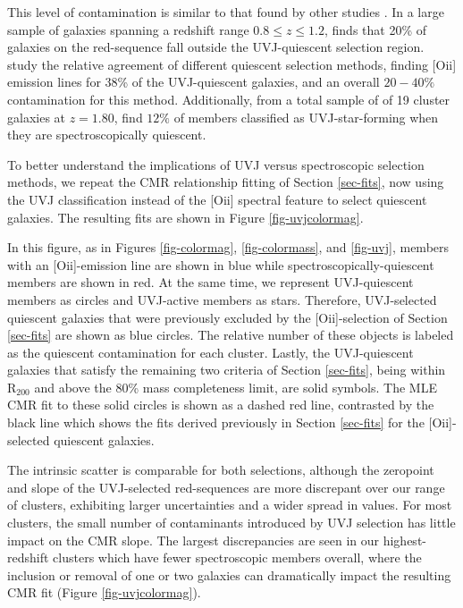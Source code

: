 This level of contamination is similar to that found by other studies \citep{kriek2014}. In a large sample of galaxies spanning a redshift range $0.8 \leq z \leq 1.2$, \citet{Cardamone:2010aa} finds that 20\% of galaxies on the red-sequence fall outside the UVJ-quiescent selection region. \citet{Moresco:2013aa} study the relative agreement of different quiescent selection methods, finding [O{\sc ii}] emission lines for 38\% of the UVJ-quiescent galaxies, and an overall $20-40\%$ contamination for this method. Additionally, from a total sample of of 19 cluster galaxies at $z = 1.80$, \citet{Newman:2014aa} find $12\%$ of members classified as UVJ-star-forming when they are spectroscopically quiescent.

To better understand the implications of UVJ versus spectroscopic selection methods, we repeat the CMR relationship fitting of Section \ref{sec-fits}, now using the UVJ classification instead of the [O{\sc ii}] spectral feature to select quiescent galaxies. The resulting fits are shown in Figure \ref{fig-uvjcolormag}.

In this figure, as in Figures \ref{fig-colormag}, \ref{fig-colormass}, and \ref{fig-uvj}, members with an [O{\sc ii}]-emission line are shown in blue while spectroscopically-quiescent members are shown in red. At the same time, we represent UVJ-quiescent members as circles and UVJ-active members as stars. Therefore, UVJ-selected quiescent galaxies that were previously excluded by the [O{\sc ii}]-selection of Section \ref{sec-fits} are shown as blue circles. The relative number of these objects is labeled as the quiescent contamination for each cluster. Lastly, the UVJ-quiescent galaxies that satisfy the remaining two criteria of Section \ref{sec-fits}, being within R$_{200}$ and above the 80\% mass completeness limit, are solid symbols. The MLE CMR fit to these solid circles is shown as a dashed red line, contrasted by the black line which shows the fits derived previously in Section \ref{sec-fits} for the [O{\sc ii}]-selected quiescent galaxies.

The intrinsic scatter is comparable for both selections, although the zeropoint and slope of the UVJ-selected red-sequences are more discrepant over our range of clusters, exhibiting larger uncertainties and a wider spread in values. For most clusters, the small number of contaminants introduced by UVJ selection has little impact on the CMR slope.
The largest discrepancies are seen in our highest-redshift clusters which have fewer spectroscopic members overall, where the inclusion or removal of one or two galaxies can dramatically impact the resulting CMR fit (Figure \ref{fig-uvjcolormag}).

